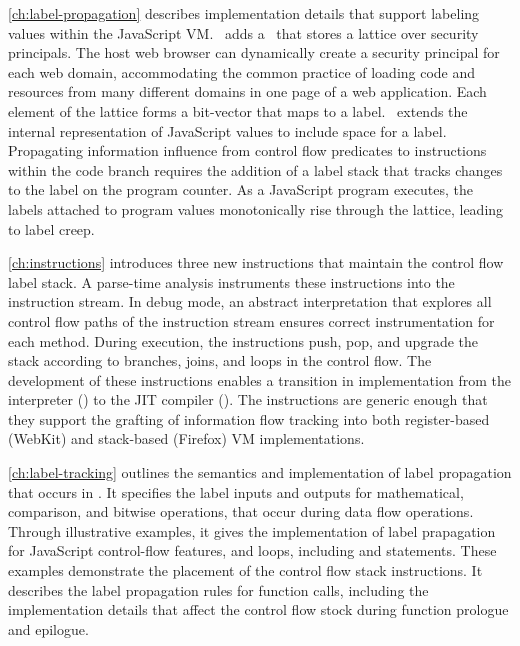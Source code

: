 \autoref{ch:label-propagation} describes implementation details that support labeling values within the JavaScript VM.
\FlowCore\ adds a \FlowLabelRegistry\ that stores a lattice over security principals.
The host web browser can dynamically create a security principal for each web domain, accommodating the common practice of loading code and resources from many different domains in one page of a web application.
Each element of the lattice forms a bit-vector that maps to a label.
\FlowCore\ extends the internal representation of JavaScript values to include space for a label.
Propagating information influence from control flow predicates to instructions within the code branch requires the addition of a label stack that tracks changes to the label on the program counter.
As a JavaScript program executes, the labels attached to program values monotonically rise through the lattice, leading to label creep.

\autoref{ch:instructions} introduces three new instructions that maintain the control flow label stack.
A parse-time analysis instruments these instructions into the instruction stream.
In debug mode, an abstract interpretation that explores all control flow paths of the instruction stream ensures correct instrumentation for each method.
During execution, the instructions push, pop, and upgrade the stack according to branches, joins, and loops in the control flow.
The development of these instructions enables a transition in implementation from the interpreter (\FlowCore) to the JIT compiler (\JitFlow).
The instructions are generic enough that they support the grafting of information flow tracking into both register-based (WebKit) and stack-based (Firefox) VM implementations.

\autoref{ch:label-tracking} outlines the semantics and implementation of label propagation that occurs in \FlowCore.
It specifies the label inputs and outputs for mathematical, comparison, and bitwise operations, that occur during data flow operations.
Through illustrative examples, it gives the implementation of label prapagation for JavaScript control-flow features,  and  loops, including  and  statements.
These examples demonstrate the placement of the control flow stack instructions.
It describes the label propagation rules for function calls, including the implementation details that affect the control flow stock during function prologue and epilogue.

